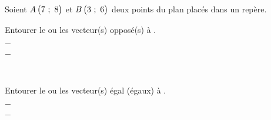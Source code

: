 \documentclass[a4paper,10pt,twocolumn,landscape]{article}
\begin{document}
\setcounter{question}{0}
Soient $A\begin{pmatrix}7~;~8\end{pmatrix}$ et $B\begin{pmatrix}3~;~6\end{pmatrix}$ deux points du plan placés dans un repère.

\question Entourer le ou les vecteur(s) opposé(s) à .\\[1em]
\begin{inparaenum}[~]
	\item {}
	\item $-$
	\item $-$
	\item {}~
\end{inparaenum}%
\question Entourer le ou les vecteur(s) égal (égaux) à .\\[1em]
\begin{inparaenum}[~]
	\item {}
	\item $-$
	\item $-$
	\item {}~
\end{inparaenum}%
\end{document}
